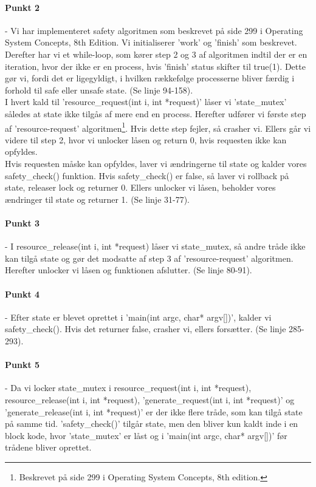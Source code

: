 \paragraph{Punkt 2} - Vi har implementeret safety algoritmen som beskrevet på side 299 i Operating System Concepts, 8th Edition. Vi initialiserer 'work' og 'finish' som beskrevet. Derefter har vi et while-loop, som kører step 2 og 3 af algoritmen indtil der er en iteration, hvor der ikke er en process, hvis 'finish' status skifter til true(1). Dette gør vi, fordi det er ligegyldigt, i hvilken rækkefølge processerne bliver færdig i forhold til safe eller unsafe state. (Se linje 94-158).
\\I hvert kald til 'resource\_request(int i, int *request)' låser vi 'state\_mutex' således at state ikke tilgås af mere end en process. Herefter udfører vi første step af 'resource-request' algoritmen\footnote{Beskrevet på side 299 i Operating System Concepts, 8th edition.}. Hvis dette step fejler, så crasher vi. Ellers går vi videre til step 2, hvor vi unlocker låsen og return 0, hvis requesten ikke kan opfyldes. 
\\Hvis requesten måske kan opfyldes, laver vi ændringerne til state og kalder vores safety\_check() funktion. Hvis safety\_check() er false, så laver vi rollback på state, releaser lock og returner 0. Ellers unlocker vi låsen, beholder vores ændringer til state og returner 1. (Se linje 31-77).
\paragraph{Punkt 3} - I resource\_release(int i, int *request)  låser vi state\_mutex, så andre tråde ikke kan tilgå state og gør det modsatte af step 3 af 'resource-request' algoritmen. Herefter unlocker vi låsen og funktionen afslutter. (Se linje 80-91).
\paragraph{Punkt 4} - Efter state er blevet oprettet i 'main(int argc, char* argv[])', kalder vi safety\_check(). Hvis det returner false, crasher vi, ellers forsætter. (Se linje 285-293).
\paragraph{Punkt 5} - Da vi locker state\_mutex i resource\_request(int i, int *request), resource\_release(int i, int *request), 'generate\_request(int i, int *request)' og 'generate\_release(int i, int *request)' er der ikke flere tråde, som kan tilgå state på samme tid. 'safety\_check()' tilgår state, men den bliver kun kaldt inde i en block kode, hvor 'state\_mutex' er låst og i 'main(int argc, char* argv[])' før trådene bliver oprettet.


